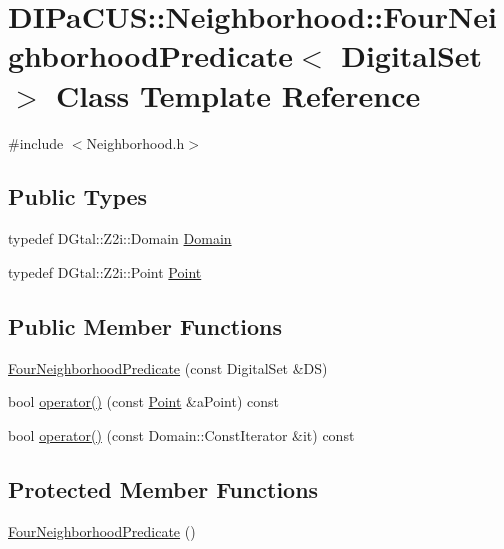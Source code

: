 \hypertarget{classDIPaCUS_1_1Neighborhood_1_1FourNeighborhoodPredicate}{}\section{D\+I\+Pa\+C\+US\+:\+:Neighborhood\+:\+:Four\+Neighborhood\+Predicate$<$ Digital\+Set $>$ Class Template Reference}
\label{classDIPaCUS_1_1Neighborhood_1_1FourNeighborhoodPredicate}


{\ttfamily \#include $<$Neighborhood.\+h$>$}

\subsection*{Public Types}
\begin{DoxyCompactItemize}
\item 
typedef D\+Gtal\+::\+Z2i\+::\+Domain \mbox{\hyperlink{classDIPaCUS_1_1Neighborhood_1_1FourNeighborhoodPredicate_acf2e866035c770ff120fa4ef6ee841f2}{Domain}}
\item 
typedef D\+Gtal\+::\+Z2i\+::\+Point \mbox{\hyperlink{classDIPaCUS_1_1Neighborhood_1_1FourNeighborhoodPredicate_abc0e0bbbb71884290b4b61935c296230}{Point}}
\end{DoxyCompactItemize}
\subsection*{Public Member Functions}
\begin{DoxyCompactItemize}
\item 
\mbox{\hyperlink{classDIPaCUS_1_1Neighborhood_1_1FourNeighborhoodPredicate_a090626c4ebc27a08542a209a575cc46e}{Four\+Neighborhood\+Predicate}} (const Digital\+Set \&DS)
\item 
bool \mbox{\hyperlink{classDIPaCUS_1_1Neighborhood_1_1FourNeighborhoodPredicate_aa3d6c31fc2de78e8194268eda1c3e1ed}{operator()}} (const \mbox{\hyperlink{classDIPaCUS_1_1Neighborhood_1_1FourNeighborhoodPredicate_abc0e0bbbb71884290b4b61935c296230}{Point}} \&a\+Point) const
\item 
bool \mbox{\hyperlink{classDIPaCUS_1_1Neighborhood_1_1FourNeighborhoodPredicate_a3f260d0a56da41b157a98be21c0bb0f7}{operator()}} (const Domain\+::\+Const\+Iterator \&it) const
\end{DoxyCompactItemize}
\subsection*{Protected Member Functions}
\begin{DoxyCompactItemize}
\item 
\mbox{\hyperlink{classDIPaCUS_1_1Neighborhood_1_1FourNeighborhoodPredicate_a7dc107e1ed2f9aaf59d4d0a76d266feb}{Four\+Neighborhood\+Predicate}} ()
\end{DoxyCompactItemize}


